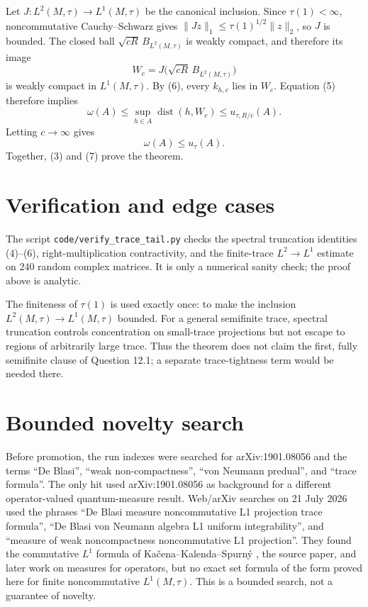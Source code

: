 \documentclass[11pt]{article}
\newcommand{\dist}{\operatorname{dist}}
\newcommand{\uu}{u_\tau}
\begin{document}
Let $J:L^2(M,\tau)\to L^1(M,\tau)$ be the canonical inclusion. Since
$\tau(1)<\infty$, noncommutative Cauchy--Schwarz gives
$\|Jz\|_1\leq\tau(1)^{1/2}\|z\|_2$, so $J$ is bounded. The closed ball
$\sqrt{cR}\,B_{L^2(M,\tau)}$ is weakly compact, and therefore its image
\[
 W_c=J\bigl(\sqrt{cR}\,B_{L^2(M,\tau)}\bigr)
\]
is weakly compact in $L^1(M,\tau)$. By (6), every $k_{h,c}$ lies in $W_c$.
Equation (5) therefore implies
\[
 \omega(A)\leq\sup_{h\in A}\dist(h,W_c)
 \leq u_{\tau,R/c}(A).
\]
Letting $c\to\infty$ gives
\[
 \omega(A)\leq\uu(A).                                        \tag{7}
\]
Together, (3) and (7) prove the theorem.

\section{Verification and edge cases}

The script \texttt{code/verify\_trace\_tail.py} checks the spectral truncation
identities (4)--(6), right-multiplication contractivity, and the finite-trace
$L^2\to L^1$ estimate on 240 random complex matrices. It is only a numerical
sanity check; the proof above is analytic.

The finiteness of $\tau(1)$ is used exactly once: to make the inclusion
$L^2(M,\tau)\to L^1(M,\tau)$ bounded. For a general semifinite trace, spectral
truncation controls concentration on small-trace projections but not escape to
regions of arbitrarily large trace. Thus the theorem does not claim the first,
fully semifinite clause of Question 12.1; a separate trace-tightness term would
be needed there.

\section{Bounded novelty search}

Before promotion, the run indexes were searched for arXiv:1901.08056 and the
terms ``De Blasi'', ``weak non-compactness'', ``von Neumann predual'', and
``trace formula''. The only hit used arXiv:1901.08056 as background for a
different operator-valued quantum-measure result. Web/arXiv searches on 21 July
2026 used the phrases ``De Blasi measure noncommutative L1 projection trace
formula'', ``De Blasi von Neumann algebra L1 uniform integrability'', and
``measure of weak noncompactness noncommutative L1 projection''. They found the
commutative $L^1$ formula of Ka\v{c}ena--Kalenda--Spurn\'y \cite{KKS}, the source
paper, and later work on measures for operators, but no exact set formula of
the form proved here for finite noncommutative $L^1(M,\tau)$. This is a bounded
search, not a guarantee of novelty.
\end{document}
